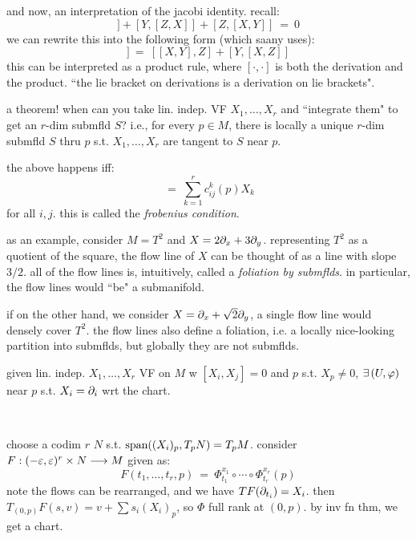 and now, an interpretation of the jacobi identity. recall:
\begin{equation*}
	[X,[Y,Z]] + [Y,[Z,X]] + [Z,[X,Y]] \ = \ 0
\end{equation*}
we can rewrite this into the following form (which saany uses):
\begin{equation*}
	[X,[Y,Z]] \ = \ [[X,Y],Z] + [Y,[X,Z]]
\end{equation*}
this can be interpreted as a product rule, where $[\cdot,\cdot]$ is both
the derivation and the product.
``the lie bracket on derivations is a derivation on lie brackets".

a theorem! when can you take lin. indep. VF $X_{1},\dots,X_{r}$ and ``integrate them" to
get an $r$-dim submfld $S$?
i.e., for every $p\in M$, there is locally a unique $r$-dim submfld $S$ thru $p$
s.t. $X_{1},\dots,X_{r}$ are tangent to $S$ near $p$.

\begin{thm}[title=Frobenius' Theorem]
	the above happens iff:
	\begin{equation*}
		[X_{i},X_{j}] \ = \ \sum_{k=1}^{r}c_{ij}^{k}(p)X_{k}
	\end{equation*}
	for all $i,j$. this is called the \textit{frobenius condition}.
\end{thm}
as an example, consider $M=T^{2}$ and $X=2\partial_{x}+3\partial_{y}$.
representing $T^{2}$ as a quotient of the square, the flow line of $X$ can
be thought of as a line with slope $3/2$.
all of the flow lines is, intuitively, called a \textit{foliation by submflds}.
in particular, the flow lines would ``be" a submanifold.

if on the other hand, we consider $X=\partial_{x}+\sqrt{2}\partial_{y}$, a single
flow line would densely cover $T^{2}$.
the flow lines also define a foliation, i.e. a locally nice-looking
partition into submflds, but globally they are not submflds.

\begin{lm}[title=Flow-straightening lemma]
	given lin. indep. $X_{1},\dots,X_{r}$ VF on $M$ w $[X_{i},X_{j}]=0$ and
	$p$ s.t. $X_{p}\neq0$, $\ex(U,\vphi)$ near $p$ s.t. $X_{i}=\partial_{i}$ wrt the chart.
\end{lm} \

\begin{pf}
	choose a codim $r$ $N$ s.t. $\textrm{span}((X_{i})_{p},T_{p}N)=T_{p}M$.
	consider $F:(-\varepsilon,\varepsilon)^{r}\times N\longrightarrow M$ given as:
	\begin{equation*}
		F(t_{1},\dots,t_{r},p) \ = \ \Phi_{t_{1}}^{x_{1}}\circ\cdots\circ\Phi_{t_{r}}^{x_{r}}(p)
	\end{equation*}
	note the flows can be rearranged, and we have $TF(\partial_{t_{i}})=X_{i}$.
	then $T_{(0,p)}F(s,v)=v+\sum s_{i}(X_{i})_{p}$, so $\Phi$ full rank at $(0,p)$.
	by inv fn thm, we get a chart.
\end{pf}

